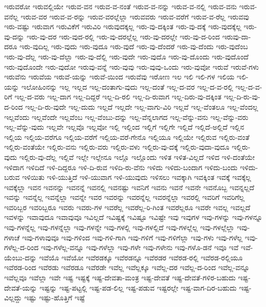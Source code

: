 {ಇರುವರೋ
ಇರುವಲ್ಲಿಯೇ
ಇರುವ-ವನ
ಇರುವ-ವ-ನಂತೆ
ಇರುವ-ವ-ನನ್ನು
ಇರುವ-ವ-ನಲ್ಲಿ
ಇರುವ-ವನು
ಇರುವ-ವನೆಲ್ಲ
ಇರುವ-ವರ
ಇರುವ-ವ-ರನ್ನು
ಇರುವ-ವರಲ್ಲೆಲ್ಲಾ
ಇರುವವರು
ಇರುವ-ವರೆಗೆ
ಇರುವ-ವ-ರೆಲ್ಲ
ಇರುವವು
ಇರು-ವಷ್ಟು
ಇರುವಾಗ
ಇರುವಿಕೆಗೆ
ಇರುವಿರಿ
ಇರುವುದಕ್ಕಲ್ಲ
ಇರು-ವು-ದಕ್ಕಿಂತ
ಇರು-ವು-ದಕ್ಕೆ
ಇರು-ವುದಕ್ಕೆಲ್ಲ
ಇರು-ವು-ದನ್ನು
ಇರು-ವು-ದರ
ಇರು-ವುದ-ರಲ್ಲಿ
ಇರು-ವು-ದರಲ್ಲೆಲ್ಲ
ಇರು-ವು-ದರಲ್ಲೇ
ಇರು-ವು-ದ-ರಿಂದ
ಇರುವು-ದಾ-ದರೂ
ಇರು-ವುದಿಲ್ಲ
ಇರು-ವುದು
ಇರು-ವುದೂ
ಇರು-ವುದೆ
ಇರು-ವು-ದೆಂದರೆ
ಇರು-ವು-ದೆಂದು
ಇರು-ವುದೆಂಬ
ಇರು-ವು-ದೆಲ್ಲ
ಇರು-ವು-ದೆಲ್ಲಾ
ಇರು-ವು-ದೆಲ್ಲಿ
ಇರು-ವುದೇ
ಇರು-ವುದೊ
ಇರು-ವು-ದೊಂದು
ಇರು-ವುದೊಂದೆ
ಇರು-ವುದೊಂದೇ
ಇರು-ವುದೋ
ಇರುವು-ವನ್ನೆ
ಇರು-ವುವು
ಇರು-ವುವು-ಒಂದು
ಇರು-ವುವೋ
ಇರುವೆ
ಇರುವೆ-ಗಳು
ಇರುವೆನು
ಇರುವೆಯ
ಇರುವೆ-ಯನ್ನು
ಇರುವೆ-ಯಿಂದ
ಇರುವೆವು
ಇರೋಣ
ಇಲ
ಇಲಿ
ಇಲಿ-ಗಳ
ಇಲಿಯ
ಇಲಿ-ಯನ್ನು
ಇಲೋಹಿಂನನ್ನು
ಇಲ್ಲ
ಇಲ್ಲದ
ಇಲ್ಲ-ದಂತಾಗು-ವುದು
ಇಲ್ಲ-ದಂತೆ
ಇಲ್ಲ-ದ-ವರ
ಇಲ್ಲ-ದ-ವ-ರಲ್ಲಿ
ಇಲ್ಲ-ದ-ವ-ರಿಗೆ
ಇಲ್ಲ-ದ-ವರು
ಇಲ್ಲ-ದಾಗ
ಇಲ್ಲ-ದಿದ್ದರೆ
ಇಲ್ಲ-ದಿ-ರಲಿ
ಇಲ್ಲ-ದಿ-ರುವಾಗ
ಇಲ್ಲ-ದಿರು-ವು-ದಕ್ಕಿಂತ
ಇಲ್ಲ-ದಿ-ರು-ವು-ದ-ರಿಂದ
ಇಲ್ಲ-ದಿ-ರು-ವುದೇ
ಇಲ್ಲ-ದುದು
ಇಲ್ಲದೆ
ಇಲ್ಲದೇ
ಇಲ್ಲ-ವಾಗು-ವಿರಿ
ಇಲ್ಲವೆ
ಇಲ್ಲ-ವೆಂತಲೂ
ಇಲ್ಲ-ವೆಂದಲ್ಲ
ಇಲ್ಲವೆಂದು
ಇಲ್ಲವೆಂದೇ
ಇಲ್ಲವೆಂಬ
ಇಲ್ಲ-ವೆಂಬು-ದನ್ನು
ಇಲ್ಲ-ವೆನ್ನಲಾಗದ
ಇಲ್ಲ-ವೆನ್ನು-ವನು
ಇಲ್ಲ-ವೆನ್ನು-ವರು
ಇಲ್ಲ-ವೆನ್ನು-ವುದು
ಇಲ್ಲವೇ
ಇಲ್ಲವೊ
ಇಲ್ಲವೋ
ಇಲ್ಲಿ
ಇಲ್ಲಿಂದ
ಇಲ್ಲಿಗೆ
ಇಲ್ಲಿಗೇ
ಇಲ್ಲಿದೆ
ಇಲ್ಲಿದೆ-ಅಲ್ಲಿದೆ
ಇಲ್ಲಿನ
ಇಲ್ಲಿಯ
ಇಲ್ಲಿಯ-ವರೆಗೂ
ಇಲ್ಲಿಯ-ವರೆಗೆ
ಇಲ್ಲಿಯ-ವರೆ-ಗೇನೊ
ಇಲ್ಲಿಯೂ
ಇಲ್ಲಿಯೇ
ಇಲ್ಲಿರುವ
ಇಲ್ಲಿರು-ವಂತೆ
ಇಲ್ಲಿರು-ವಂತೆಯೇ
ಇಲ್ಲಿರು-ವನು
ಇಲ್ಲಿರು-ವರು
ಇಲ್ಲಿರು-ವಳು
ಇಲ್ಲಿರು-ವು-ದಕ್ಕೆ
ಇಲ್ಲಿರು-ವುದಾ-ವುದೂ
ಇಲ್ಲಿರು-ವುದು
ಇಲ್ಲಿರು-ವು-ದೆಲ್ಲ
ಇಲ್ಲಿವೆ
ಇಲ್ಲೇ
ಇಲ್ಲೇನೂ
ಇಲ್ಲೊ
ಇಲ್ಲೊಂದು
ಇಳಿತ
ಇಳಿತ-ವಿಲ್ಲದೆ
ಇಳಿದ
ಇಳಿ-ದಂತೆಯೇ
ಇಳಿದಾಗ
ಇಳಿದಿದೆ
ಇಳಿ-ದಿದ್ದರೂ
ಇಳಿ-ದಿ-ರುವ
ಇಳಿದಿ-ರು-ವೆನು
ಇಳಿದು
ಇಳಿದು-ಬಂದಾಗ
ಇಳಿದು-ಬಂದು
ಇಳಿದು-ಬರುವ
ಇಳಿಯಿತು
ಇಳಿ-ಯುತ್ತಿದೆ
ಇಳಿ-ಯುವಾಗ
ಇಳಿ-ಯುವುದು
ಇಳಿಸಲು
ಇವಕ್ಕಾಗಿ
ಇವಕ್ಕಿಂತ
ಇವಕ್ಕೆ
ಇವಕ್ಕೆಲ್ಲ
ಇವಕ್ಕೆಲ್ಲಾ
ಇವನ
ಇವನನ್ನು
ಇವನನ್ನೆ
ಇವನಲ್ಲಿ
ಇವನಷ್ಟು
ಇವನಿಗೆ
ಇವನು
ಇವನೆ
ಇವನೇ
ಇವನೊಬ್ಬ
ಇವನ್ನಲ್ಲದೆ
ಇವನ್ನು
ಇವನ್ನೆಲ್ಲ
ಇವನ್ನೆಲ್ಲಾ
ಇವನ್ನೇ
ಇವರ
ಇವರನ್ನು
ಇವರನ್ನೆಲ್ಲ
ಇವರನ್ನೆಲ್ಲಾ
ಇವರಲ್ಲಿ
ಇವರಿಗೆ
ಇವರಿಗೆಲ್ಲ
ಇವರಿಬ್ಬರ
ಇವರಿಬ್ಬರೂ
ಇವರು
ಇವರು-ಗಳ
ಇವರೆಲ್ಲ
ಇವರೆಲ್ಲ-ರಿ-ಗಿಂತ
ಇವರೆಲ್ಲರೂ
ಇವರೇ
ಇವಲ್ಲ
ಇವಲ್ಲದೆ
ಇವಳನ್ನು
ಇವಾವುದೂ
ಇವಾವುವೂ
ಇವಿಲ್ಲದೆ
ಇವಿಷ್ಟಕ್ಕೆ
ಇವಿಷ್ಟೂ
ಇವಿಷ್ಟೇ
ಇವು
ಇವುಗಳ
ಇವು-ಗಳನ್ನು
ಇವು-ಗಳನ್ನೂ
ಇವು-ಗಳನ್ನೆಲ್ಲ
ಇವು-ಗಳನ್ನೆಲ್ಲಾ
ಇವು-ಗಳನ್ನೇ
ಇವು-ಗಳಲ್ಲಿ
ಇವು-ಗಳಲ್ಲಿದೆ
ಇವು-ಗಳಲ್ಲೆಲ್ಲ
ಇವು-ಗಳಲ್ಲೆಲ್ಲಾ
ಇವು-ಗಳಾಚೆ
ಇವು-ಗಳಾವುವೂ
ಇವು-ಗಳಿಂದ
ಇವು-ಗಳಿ-ಗಾಗಿ
ಇವು-ಗಳಿಗೆ
ಇವು-ಗಳಿಗೆಲ್ಲಾ
ಇವು-ಗಳು
ಇವು-ಗಳೆಲ್ಲ
ಇವು-ಗಳೆಲ್ಲ-ದ-ರಿಂದ
ಇವು-ಗಳೆಲ್ಲ-ವನ್ನೂ
ಇವು-ಗಳೆಲ್ಲಾ
ಇವು-ಗಳೇ
ಇವು-ಗಳೇನು
ಇವು-ಗಳೊ-ಡನೆ
ಇವೂ
ಇವೆ
ಇವೆ-ಯೆಂಬು-ದನ್ನು
ಇವೆಯೊ
ಇವೆಯೋ
ಇವೆರಡಕ್ಕೂ
ಇವೆರಡನ್ನೂ
ಇವೆರಡರ
ಇವೆರಡ-ರಲ್ಲಿ
ಇವೆರಡ-ರಲ್ಲಿಯೂ
ಇವೆರಡ-ರಿಂದ
ಇವೆರಡು
ಇವೆರಡೂ
ಇವೆರಡೇ
ಇವೆಲ್ಲ
ಇವೆಲ್ಲಕ್ಕೂ
ಇವೆಲ್ಲ-ದರ
ಇವೆಲ್ಲ-ದ-ರಿಂದ
ಇವೆಲ್ಲ-ವನ್ನೂ
ಇವೆಲ್ಲವೂ
ಇವೆಲ್ಲಾ
ಇವೇ
ಇಷ್ಟ
ಇಷ್ಟಕ್ಕೆ
ಇಷ್ಟ-ದೇವತಾ-ಮಂತ್ರ
ಇಷ್ಟ-ದೇವತೆ
ಇಷ್ಟ-ದೇವತೆ-ಗಳಿರ-ಬಹುದು
ಇಷ್ಟ-ದೇವತೆ-ಯನ್ನು
ಇಷ್ಟನ್ನು
ಇಷ್ಟ-ಪಟ್ಟಲ್ಲಿ
ಇಷ್ಟ-ಪಡ-ಲಿಲ್ಲ
ಇಷ್ಟ-ಪಡುವ
ಇಷ್ಟರಲ್ಲೇ
ಇಷ್ಟ-ವಾಗ-ದಿರ-ಬಹುದು
ಇಷ್ಟ-ವಿಲ್ಲದ್ದು
ಇಷ್ಟು
ಇಷ್ಟು-ಹೊತ್ತಿಗೆ
ಇಷ್ಟೆ
}
